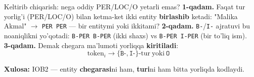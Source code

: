 \documentclass[aspectratio=169,11pt]{beamer}
\begin{document}
\begin{frame}{Keltirib chiqarish: nega oddiy PER/LOC/O yetarli emas?}
  \textbf{1-qadam.} Faqat tur yorlig'i (PER/LOC/O) bilan ketma-ket ikki entity
  \textbf{birlashib} ketadi: "Malika Akmal" $\to$ \texttt{PER PER} --- bir entitymi
  yoki ikkitami?
  \pause
  \textbf{2-qadam.} \texttt{B-}/\texttt{I-} ajratuvi bu noaniqlikni yo'qotadi:
  \texttt{B-PER B-PER} (ikki shaxs) vs \texttt{B-PER I-PER} (bir to'liq ism).
  \pause
  \textbf{3-qadam.} Demak chegara ma'lumoti yorliqqa \textbf{kiritiladi}:
  $$ \text{token}_i \to \{\texttt{B-},\texttt{I-}\}\text{-tur} \ \text{yoki}\ \texttt{O} $$
  \begin{tcolorbox}[okbox,top=2pt,bottom=2pt]
    \small \textbf{Xulosa:} IOB2 --- entity \textbf{chegarasi}ni ham, \textbf{turi}ni
    ham bitta yorliqda kodlaydi.
  \end{tcolorbox}
\end{frame}
\end{document}
